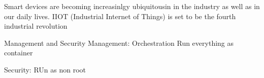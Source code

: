 Smart devices are becoming increasinlgy ubiquitousin in the industry as well as in our daily lives. IIOT (Industrial Internet of Things) is set to be the fourth industrial revolution

Management and Security
Management:
Orchestration
Run everything as container


Security:
RUn as non root
